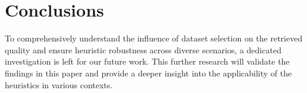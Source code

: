 \documentclass[sn-mathphys-num]{sn-jnl}
\theoremstyle{definition}
\begin{document}






%









\section{Conclusions}\label{sec:conclusions}
To comprehensively understand the influence of dataset selection on the retrieved quality and ensure heuristic robustness across diverse scenarios, a dedicated investigation is left for our future work. This further research will validate the findings in this paper and provide a deeper insight into the applicability of the heuristics in various contexts.

\clearpage
\end{document}
